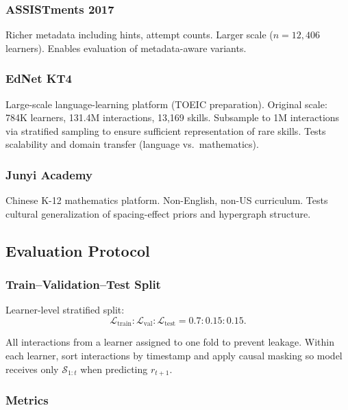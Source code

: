 \documentclass[preprint,12pt]{elsarticle}
\begin{document}
\subsubsection{ASSISTments 2017}

Richer metadata including hints, attempt counts. Larger scale ($n = 12,406$ learners). Enables evaluation of metadata-aware variants.

\subsubsection{EdNet KT4}

Large-scale language-learning platform (TOEIC preparation). Original scale: 784K learners, 131.4M interactions, 13,169 skills. Subsample to 1M interactions via stratified sampling to ensure sufficient representation of rare skills. Tests scalability and domain transfer (language vs.\ mathematics).

\subsubsection{Junyi Academy}

Chinese K-12 mathematics platform. Non-English, non-US curriculum. Tests cultural generalization of spacing-effect priors and hypergraph structure.

\subsection{Evaluation Protocol}

\subsubsection{Train--Validation--Test Split}

Learner-level stratified split:
\begin{equation}
\mathcal{L}_{\text{train}} : \mathcal{L}_{\text{val}} : \mathcal{L}_{\text{test}} = 0.7 : 0.15 : 0.15.
\end{equation}

All interactions from a learner assigned to one fold to prevent leakage. Within each learner, sort interactions by timestamp and apply causal masking so model receives only $\mathcal{S}_{1:t}$ when predicting $r_{t+1}$.

\subsubsection{Metrics}
\end{document}
